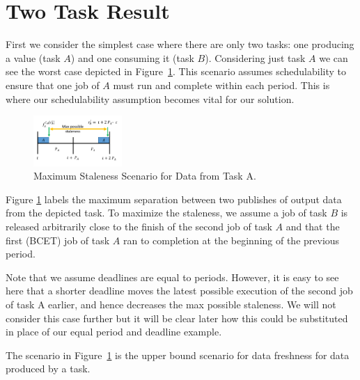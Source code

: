 \section{Two Task Result}

First we consider the simplest case where there are only two tasks: one producing a value (task $A$) and one consuming it (task $B$). Considering just task $A$ we can see the worst case depicted in Figure~\ref{fig:2Tasks}. This scenario assumes schedulability to ensure that one job of $A$ must run and complete within each period. This is where our schedulability assumption becomes vital for our solution.

\begin{figure}[h]
	\centering
	\includegraphics[width=0.3\textwidth]{figures/2TaskMaxStaleness}
	\caption{Maximum Staleness Scenario for Data from Task A.}
	\label{fig:2Tasks}
\end{figure}

Figure \ref{fig:2Tasks} labels the maximum separation between two publishes of output data from the depicted task. To maximize the staleness, we assume a job of task $B$ is released arbitrarily close to the finish of the second job of task $A$ and that the first (BCET) job of task $A$ ran to completion at the beginning of the previous period.

Note that we assume deadlines are equal to periods. However, it is easy to see here that a shorter deadline moves the latest possible execution of the second job of task A earlier, and hence decreases the max possible staleness. We will not consider this case further but it will be clear later how this could be substituted in place of our equal period and deadline example.

\begin{theorem}
	\label{thm:2TaskMaxWaiting}
	The scenario in Figure~\ref{fig:2Tasks} is the upper bound scenario for data freshness for data produced by a task.
\end{theorem}

